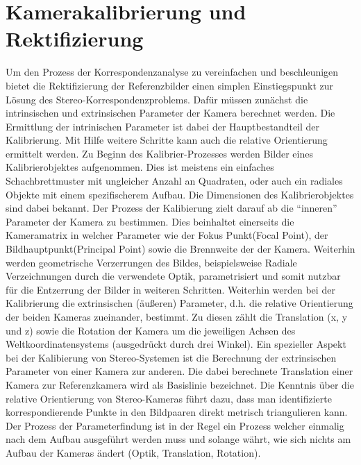 \section{Kamerakalibrierung und Rektifizierung}
\label{sec:camera_calibration}
Um den Prozess der Korrespondenzanalyse zu vereinfachen und beschleunigen bietet die Rektifizierung der Referenzbilder einen simplen Einstiegspunkt zur Lösung des Stereo-Korrespondenzproblems. Dafür müssen zunächst die intrinsischen und extrinsischen Parameter der Kamera berechnet werden. Die Ermittlung der intrinischen Parameter ist dabei der Hauptbestandteil der Kalibrierung. Mit Hilfe weitere Schritte kann auch die relative Orientierung ermittelt werden. Zu Beginn des Kalibrier-Prozesses werden Bilder eines Kalibrierobjektes aufgenommen. Dies ist meistens ein einfaches Schachbrettmuster mit ungleicher Anzahl an Quadraten, oder auch ein radiales Objekte mit einem spezifischerem Aufbau. Die Dimensionen des Kalibrierobjektes sind dabei bekannt. Der Prozess der Kalibierung zielt darauf ab die \enquote{inneren} Parameter der Kamera zu bestimmen. Dies beinhaltet einerseits die Kameramatrix in welcher Parameter wie der Fokus Punkt(Focal Point), der Bildhauptpunkt(Principal Point) sowie die Brennweite der der Kamera. Weiterhin werden geometrische Verzerrungen des Bildes, beispielsweise Radiale Verzeichnungen durch die verwendete Optik, parametrisiert und somit nutzbar für die Entzerrung der Bilder in weiteren Schritten. Weiterhin werden bei der Kalibrierung die extrinsischen (äußeren) Parameter, d.h. die relative Orientierung der beiden Kameras zueinander, bestimmt. Zu diesen zählt die Translation (x, y und z) sowie die Rotation der Kamera um die jeweiligen Achsen des Weltkoordinatensystems (ausgedrückt durch drei Winkel). Ein spezieller Aspekt bei der Kalibierung von Stereo-Systemen ist die Berechnung der extrinsischen Parameter von einer Kamera zur anderen. Die dabei berechnete Translation einer Kamera zur Referenzkamera wird als Basislinie bezeichnet. Die Kenntnis über die relative Orientierung von Stereo-Kameras führt dazu, dass man identifizierte korrespondierende Punkte in den Bildpaaren direkt metrisch triangulieren kann. Der Prozess der Parameterfindung ist in der Regel ein Prozess welcher einmalig nach dem Aufbau ausgeführt werden muss und solange währt, wie sich nichts am Aufbau der Kameras ändert (Optik, Translation, Rotation).\\

